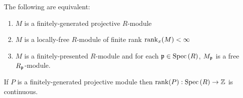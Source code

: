 \documentclass[12pt]{article}
\begin{document}
\begin{theorem}
The following are equivalent:
\begin{enumerate}
\item $M$ is a finitely-generated projective $R$-module
\item $M$ is a locally-free $R$-module of finite rank $\mathrm{rank}_x(M) < \infty$
\item $M$ is a finitely-presented $R$-module and for each $\mathfrak{p} \in \mathrm{Spec}\left( R \right)$, $M_{\mathfrak{p}}$ is a free $R_{\mathfrak{p}}$-module. 
\end{enumerate}
\end{theorem}

\begin{proposition}
If $P$ is a finitely-generated projective module then $\mathrm{rank}(P) : \mathrm{Spec}\left( R \right) \to \mathbb{Z}$ is continuous.
\end{proposition}
\end{document}
